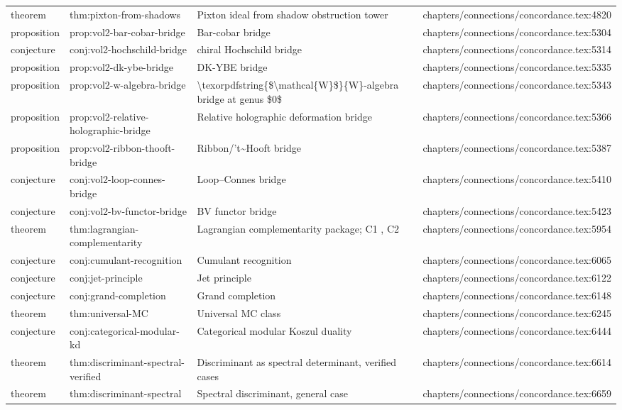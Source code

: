 \documentclass[11pt]{article}
\begin{document}
\begin{longtable}{L{0.10\textwidth}L{0.26\textwidth}L{0.42\textwidth}L{0.22\textwidth}}
theorem & thm:pixton-from-shadows & Pixton ideal from shadow obstruction tower & chapters/connections/concordance.tex:4820\\
proposition & prop:vol2-bar-cobar-bridge & Bar-cobar bridge & chapters/connections/concordance.tex:5304\\
conjecture & conj:vol2-hochschild-bridge & chiral Hochschild bridge & chapters/connections/concordance.tex:5314\\
proposition & prop:vol2-dk-ybe-bridge & DK-YBE bridge & chapters/connections/concordance.tex:5335\\
proposition & prop:vol2-w-algebra-bridge & \textbackslash{}texorpdfstring\{\$\textbackslash{}mathcal\{W\}\$\}\{W\}-algebra bridge at genus \$0\$ & chapters/connections/concordance.tex:5343\\
proposition & prop:vol2-relative-holographic-bridge & Relative holographic deformation bridge & chapters/connections/concordance.tex:5366\\
proposition & prop:vol2-ribbon-thooft-bridge & Ribbon/'t\textasciitilde{}Hooft bridge & chapters/connections/concordance.tex:5387\\
conjecture & conj:vol2-loop-connes-bridge & Loop--Connes bridge & chapters/connections/concordance.tex:5410\\
conjecture & conj:vol2-bv-functor-bridge & BV functor bridge & chapters/connections/concordance.tex:5423\\
theorem & thm:lagrangian-complementarity & Lagrangian complementarity package; C1 , C2 & chapters/connections/concordance.tex:5954\\
conjecture & conj:cumulant-recognition & Cumulant recognition & chapters/connections/concordance.tex:6065\\
conjecture & conj:jet-principle & Jet principle & chapters/connections/concordance.tex:6122\\
conjecture & conj:grand-completion & Grand completion & chapters/connections/concordance.tex:6148\\
theorem & thm:universal-MC & Universal MC class & chapters/connections/concordance.tex:6245\\
conjecture & conj:categorical-modular-kd & Categorical modular Koszul duality & chapters/connections/concordance.tex:6444\\
theorem & thm:discriminant-spectral-verified & Discriminant as spectral determinant, verified cases & chapters/connections/concordance.tex:6614\\
theorem & thm:discriminant-spectral & Spectral discriminant, general case & chapters/connections/concordance.tex:6659\\

\end{longtable}
\end{document}
